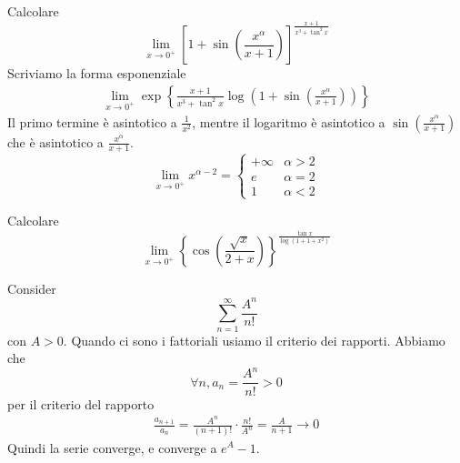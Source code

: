 \documentclass[a4paper]{article}
\begin{document}
\begin{snippetexercise}{}
    Calcolare
    \[
        \lim_{x\to 0^+} {\left[
            1 + \sin\left(\frac{x^\alpha}{x + 1}\right)
        \right]}^{
            \frac{x+1}{x^3 + \tan^2x}
        }
    \]
    Scriviamo la forma esponenziale
    \begin{align*}
        \lim_{x\to 0^+} \exp\left\{
            \frac{x+1}{x^3 + \tan^2x}
            \log\left(
                1 + \sin\left(\frac{x^\alpha}{x + 1}\right)
            \right)      
        \right\}
    \end{align*}
    Il primo termine è asintotico a \(\frac{1}{x^2}\),
    mentre il logaritmo è asintotico a \(\sin(\frac{x^\alpha}{x+1})\)
    che è asintotico a \(\frac{x^\alpha}{x+1}\).
    \[
        \lim_{x\to 0^+} x^{\alpha - 2} = \begin{cases}
            +\infty & \alpha > 2 \\
            e & \alpha = 2 \\
            1 & \alpha < 2
        \end{cases}
    \]
\end{snippetexercise}

\begin{snippetexercise}{}
    Calcolare
    \[
        \lim_{x\to 0^+}
        \left\{
            \cos\left(\frac{\sqrt{x}}{2 + x}\right)
        \right\}^{
            \frac{\tan x}{\log(1 + 1 + x^2)}
        }
    \]
\end{snippetexercise}


\begin{snippetexample}{}
    Consider
    \[
        \sum_{n=1}^\infty \frac{A^n}{n!}
    \]
    con \(A > 0\).
    Quando ci sono i fattoriali usiamo il criterio dei rapporti.
    Abbiamo che
    \[
        \forall n, a_n = \frac{A^n}{n!} > 0
    \]
    per il criterio del rapporto
    \begin{align*}
        \frac{a_{n+1}}{a_n} = \frac{A^n}{(n+1)!}
        \cdot \frac{n!}{A^n} = \frac{A}{n+1} \to 0
    \end{align*}
    Quindi la serie converge, e converge a \(e^A - 1\).
\end{snippetexample}
\end{document}
